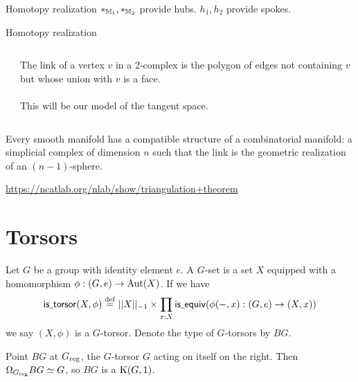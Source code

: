 \documentclass[14pt,aspectratio=169]{beamer}
\renewcommand{\defemph}[1]{\alert{#1}}
\begin{document}

\begin{frame}{Homotopy realization}
\( *_{\mathbb{M}_1}, *_{\mathbb{M}_2} \) provide \alert{hubs}. \( h_1, h_2 \) provide \alert{spokes}.
\[\]
\end{frame}


\begin{frame}{Homotopy realization}
\begin{columns}
\begin{column}{0.5\textwidth}

\end{column}
\begin{column}{0.5\textwidth}
The \defemph{link} of a vertex \( v \) in a 2-complex is the polygon of edges not containing \( v \) but whose union with \( v \) is a face.\\~\\

This will be our model of the tangent space.
\end{column}
\end{columns}
\end{frame}

\begin{frame}
\begin{theorem}[Whitehead (1940)]
Every smooth manifold has a compatible structure of a \alert{combinatorial manifold}: a simplicial complex of dimension \( n \) such that the link is the geometric realization of an \( (n-1) \)-sphere.
\end{theorem}
\url{https://ncatlab.org/nlab/show/triangulation+theorem}
\end{frame}

\section{Torsors}

\begin{frame}
\begin{definition}
Let \( G \) be a group with identity element \( e \). A \defemph{\( G \)-set} is a set \( X \) equipped with a homomorphism \( \phi:(G,e)\to\operatorname{Aut}(X) \). If we have
\[ 
\mathsf{is\underscore torsor}(X,\phi)\defeq ||X||_{-1}\times \pit{x:X}\mathsf{is\underscore equiv}(\phi(-,x):(G,e)\to (X,x))
\] we say \( (X,\phi) \) is a \defemph{\( G \)-torsor}. Denote the type of \( G \)-torsors by \( BG \).
\end{definition}
\begin{lemma}
Point \( BG \) at \( {G}_\mathrm{reg} \), the \( G \)-torsor \( G \) acting on itself on the right. Then \( \Omega_{{G}_\mathrm{reg}} BG \simeq G \), so \( BG \) is a \( \mathrm{K}(G,1) \).
\end{lemma}
\end{frame}
\end{document}
